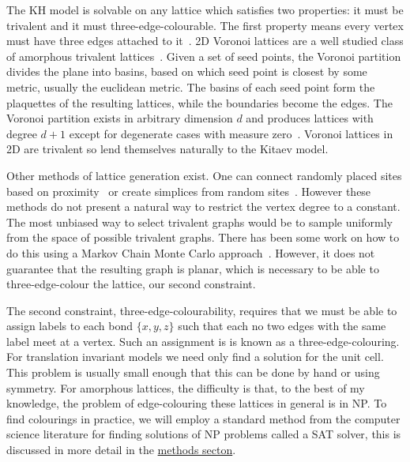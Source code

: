 The KH model is solvable on any lattice which satisfies two properties: it must be trivalent and it must three-edge-colourable. The first property means every vertex must have three edges attached to it~\autocite{kitaevAnyonsExactlySolved2006,Nussinov2009}. 2D Voronoi lattices are a well studied class of amorphous trivalent lattices~\autocite{mitchellAmorphousTopologicalInsulators2018,florescu_designer_2009,marsalTopologicalWeaireThorpeModels2020}. Given a set of seed points, the Voronoi partition divides the plane into basins, based on which seed point is closest by some metric, usually the euclidean metric. The basins of each seed point form the plaquettes of the resulting lattices, while the boundaries become the edges. The Voronoi partition exists in arbitrary dimension \(d\) and produces lattices with degree \(d+1\) except for degenerate cases with measure zero~\autocite{voronoiNouvellesApplicationsParamètres1908,watsonComputingNdimensionalDelaunay1981}. Voronoi lattices in 2D are trivalent so lend themselves naturally to the Kitaev model.

Other methods of lattice generation exist. One can connect randomly placed sites based on proximity~\autocite{agarwala2019topological} or create simplices from random sites~\autocite{christRandomLatticeField1982}. However these methods do not present a natural way to restrict the vertex degree to a constant. The most unbiased way to select trivalent graphs would be to sample uniformly from the space of possible trivalent graphs. There has been some work on how to do this using a Markov Chain Monte Carlo approach~\autocite{alyamiUniformSamplingDirected2016}. However, it does not guarantee that the resulting graph is planar, which is necessary to be able to three-edge-colour the lattice, our second constraint.

The second constraint, three-edge-colourability, requires that we must be able to assign labels to each bond \(\{x,y,z\}\) such that each no two edges with the same label meet at a vertex. Such an assignment is is known as a three-edge-colouring. For translation invariant models we need only find a solution for the unit cell. This problem is usually small enough that this can be done by hand or using symmetry. For amorphous lattices, the difficulty is that, to the best of my knowledge, the problem of edge-colouring these lattices in general is in NP. To find colourings in practice, we will employ a standard method from the computer science literature for finding solutions of NP problems called a SAT solver, this is discussed in more detail in the \protect\hyperlink{amk-methods}{methods secton}.

